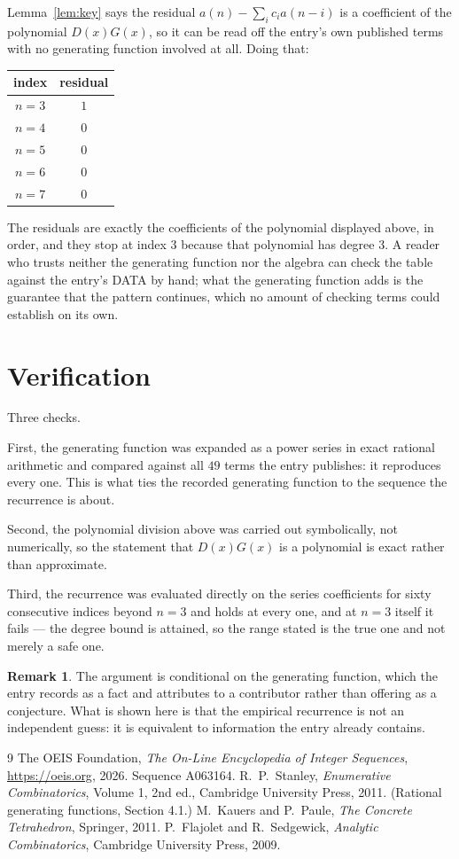 \documentclass[11pt,a4paper]{article}
\theoremstyle{plain}
\theoremstyle{definition}
\newtheorem{remark}[theorem]{Remark}
\begin{document}
Lemma~\ref{lem:key} says the residual $a(n)-\sum_ic_ia(n-i)$ is a coefficient of the
polynomial $D(x)G(x)$, so it can be read off the entry's own published terms with no
generating function involved at all. Doing that:
\begin{center}
\begin{tabular}{cc}
index & residual \\ \hline
$n=3$ & $1$ \\
$n=4$ & $0$ \\
$n=5$ & $0$ \\
$n=6$ & $0$ \\
$n=7$ & $0$
\end{tabular}
\end{center}
The residuals are exactly the coefficients of the polynomial displayed above, in order, and
they stop at index $3$ because that polynomial has degree $3$. A reader who trusts
neither the generating function nor the algebra can check the table against the entry's DATA
by hand; what the generating function adds is the guarantee that the pattern continues, which
no amount of checking terms could establish on its own.

\section{Verification}

Three checks.

First, the generating function was expanded as a power series in exact rational arithmetic and
compared against all $49$ terms the entry publishes: it reproduces every one. This is
what ties the recorded generating function to the sequence the recurrence is about.

Second, the polynomial division above was carried out symbolically, not numerically, so the
statement that $D(x)G(x)$ is a polynomial is exact rather than approximate.

Third, the recurrence was evaluated directly on the series coefficients for sixty consecutive
indices beyond $n=3$ and holds at every one, and at $n=3$ itself it fails --- the
degree bound is attained, so the range stated is the true one and not merely a safe one.

\begin{remark}
The argument is conditional on the generating function, which the entry records as a fact and
attributes to a contributor rather than offering as a conjecture. What is shown here is that
the empirical recurrence is not an independent guess: it is equivalent to information the
entry already contains.
\end{remark}

\begin{thebibliography}{9}
 The OEIS Foundation, \emph{The On-Line Encyclopedia of Integer
Sequences}, \url{https://oeis.org}, 2026. Sequence A063164.
 R.~P.~Stanley, \emph{Enumerative Combinatorics}, Volume 1, 2nd ed.,
Cambridge University Press, 2011. (Rational generating functions, Section 4.1.)
 M.~Kauers and P.~Paule, \emph{The Concrete Tetrahedron}, Springer, 2011.
 P.~Flajolet and R.~Sedgewick, \emph{Analytic Combinatorics}, Cambridge
University Press, 2009.
\end{thebibliography}
\end{document}
